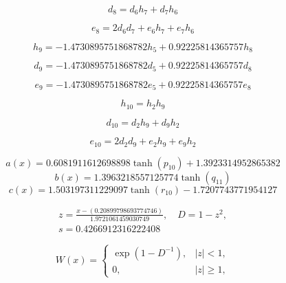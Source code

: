 \begin{equation}
d_{8}=d_{6} h_{7} + d_{7} h_{6}
\end{equation}


\begin{equation}
e_{8}=2 d_{6} d_{7} + e_{6} h_{7} + e_{7} h_{6}
\end{equation}


\begin{equation}
h_{9}=- 1.4730895751868782 h_{5} + 0.92225814365757 h_{8}
\end{equation}


\begin{equation}
d_{9}=- 1.4730895751868782 d_{5} + 0.92225814365757 d_{8}
\end{equation}


\begin{equation}
e_{9}=- 1.4730895751868782 e_{5} + 0.92225814365757 e_{8}
\end{equation}


\begin{equation}
h_{10}=h_{2} h_{9}
\end{equation}


\begin{equation}
d_{10}=d_{2} h_{9} + d_{9} h_{2}
\end{equation}


\begin{equation}
e_{10}=2 d_{2} d_{9} + e_{2} h_{9} + e_{9} h_{2}
\end{equation}


\begin{equation}
a(x)=0.6081911612698898 \tanh{\left(p_{10} \right)} + 1.3923314952865382
\end{equation}
\begin{equation}
b(x)=1.3963218557125774 \tanh{\left(q_{11} \right)}
\end{equation}
\begin{equation}
c(x)=1.503197311229097 \tanh{\left(r_{10} \right)} - 1.7207743771954127
\end{equation}


\begin{equation}
\begin{aligned}z=\frac{x-(0.20899798693774746)}{1.9721061459030749},\quad D=1-z^2,\\s=0.4266912316222408\end{aligned}
\end{equation}


\begin{equation}
W(x)=\begin{cases}\exp(1-D^{-1}),&|z|<1,\\0,&|z|\ge1,\end{cases}
\end{equation}


